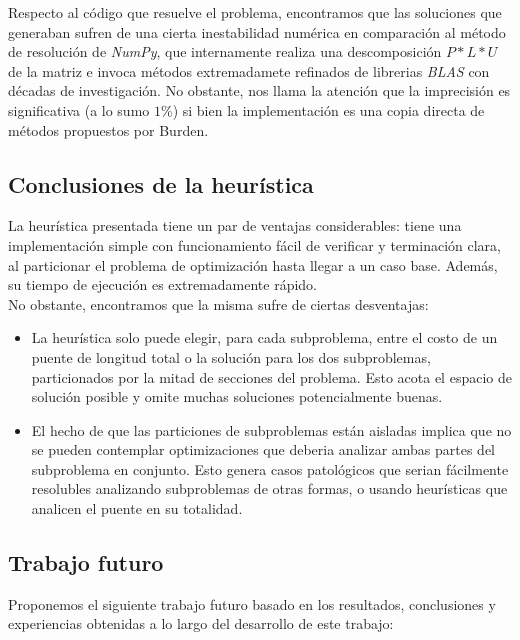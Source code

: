 Respecto al código que resuelve el problema, encontramos que las soluciones que generaban sufren de una cierta inestabilidad numérica en comparación al método de resolución de \textit{NumPy}, que internamente realiza una descomposición $P * L * U$ de la matriz e invoca métodos extremadamete refinados de librerias \textit{BLAS} con décadas de investigación. No obstante, nos llama la atención que la imprecisión es significativa (a lo sumo $1\%$) si bien la implementación es una copia directa de métodos propuestos por Burden.

\subsection{Conclusiones de la heurística}

La heurística presentada tiene un par de ventajas considerables: tiene una implementación simple con funcionamiento fácil de verificar y terminación clara, al particionar el problema de optimización hasta llegar a un caso base. Además, su tiempo de ejecución es extremadamente rápido.\\

No obstante, encontramos que la misma sufre de ciertas desventajas:\\

\begin{itemize}
\item La heurística solo puede elegir, para cada subproblema, entre el costo de un puente de longitud total o la solución para los dos subproblemas, particionados por la mitad de secciones del problema. Esto acota el espacio de solución posible y omite muchas soluciones potencialmente buenas.
\item El hecho de que las particiones de subproblemas están aisladas implica que no se pueden contemplar optimizaciones que deberia analizar ambas partes del subproblema en conjunto. Esto genera casos patológicos que serian fácilmente resolubles analizando subproblemas de otras formas, o usando heurísticas que analicen el puente en su totalidad.
\end{itemize}

\subsection{Trabajo futuro}
Proponemos el siguiente trabajo futuro basado en los resultados, conclusiones y experiencias obtenidas a lo largo del desarrollo de este trabajo:

